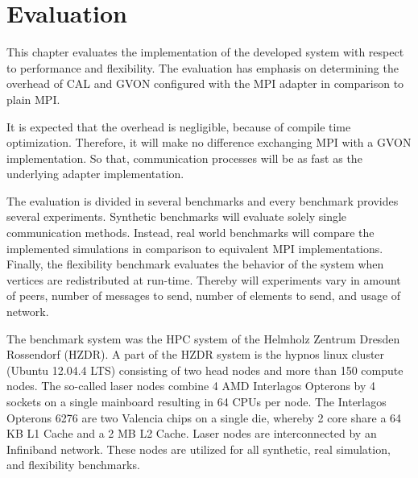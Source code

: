 \chapter{Evaluation}
\label{sec:evaluation}


This chapter evaluates the implementation of the developed
system with respect to performance and flexibility.  The
evaluation has emphasis on determining the overhead of CAL and GVON
configured with the MPI adapter in comparison to plain MPI.

It is expected that the overhead is negligible, because of compile
time optimization. Therefore, it will make no difference exchanging
MPI with a GVON implementation. So that, communication processes will
be as fast as the underlying adapter implementation.

The evaluation is divided in several benchmarks and every benchmark
provides several experiments. Synthetic benchmarks will evaluate
solely single communication methods. Instead, real world benchmarks
will compare the implemented simulations in comparison to equivalent
MPI implementations. Finally, the flexibility benchmark evaluates the
behavior of the system when vertices are redistributed at run-time.
Thereby will experiments vary in amount of peers, number of messages
to send, number of elements to send, and usage of network.

The benchmark system was the HPC system of the Helmholz
Zentrum Dresden Rossendorf (HZDR)\cite{ref:hzdr_cluster}.
A part of the HZDR system is the hypnos linux cluster (Ubuntu 12.04.4
LTS) consisting of two head nodes and more than 150 compute nodes.
The so-called laser nodes combine 4 AMD Interlagos Opterons by 4
sockets on a single mainboard resulting in 64 CPUs per node.  The
Interlagos Opterons 6276 are two Valencia chips on a single die,
whereby 2 core share a 64 KB L1 Cache and a 2 MB L2 Cache. Laser nodes
are interconnected by an Infiniband network. These nodes are utilized
for all synthetic, real simulation, and flexibility benchmarks.

